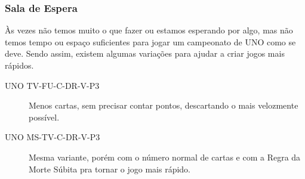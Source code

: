 \subsubsection{Sala de Espera}

Às vezes não temos muito o que fazer ou estamos esperando por algo, mas não temos tempo ou espaço suficientes para jogar um campeonato de UNO como se deve. Sendo assim, existem algumas variações para ajudar a criar jogos mais rápidos.

\begin{description}
\item[UNO TV-FU-C-DR-V-P3]{Menos cartas, sem precisar contar pontos, descartando o mais velozmente possível.}
\item[UNO MS-TV-C-DR-V-P3]{Mesma variante, porém com o número normal de cartas e com a Regra da Morte Súbita pra tornar o jogo mais rápido.}
\end{description}
